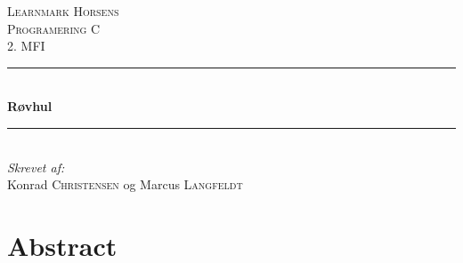 \documentclass[12pt]{article}
\begin{document}
\begin{titlepage}

	\newcommand{\HRule}{\rule{\linewidth}{0.5mm}}

	\center


	\textsc{\LARGE Learnmark Horsens}\\[1.5cm] %
	\textsc{\Large Programering C}\\[0.5cm] %
	\textsc{\large 2. MFI}\\[0.5cm] %


	\HRule \\[0.4cm]
	{ \huge \bfseries R\o vhul}\\[0.4cm]
	\HRule \\[1.5cm]


	\Large \emph{Skrevet af:}\\
	Konrad \textsc{Christensen} og Marcus \textsc{Langfeldt} \\[3cm]

	\vfill

\end{titlepage}

\pagebreak


\tableofcontents

\vfill

\pagebreak


\section{Abstract}
\end{document}
